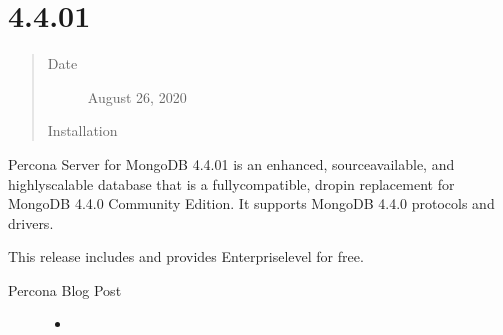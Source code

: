 \documentclass[letterpaper,10pt,english]{sphinxmanual}
\begin{document}
\section{ 4.4.0\sphinxhyphen{}1}
\label{\detokenize{release_notes/4.4.0-1:percona-server-for-mongodb-4-4-0-1}}\label{\detokenize{release_notes/4.4.0-1:psmdb-4-4-0-1}}\label{\detokenize{release_notes/4.4.0-1::doc}}\begin{quote}\begin{description}
\item[{Date}] \leavevmode
\sphinxAtStartPar
August 26, 2020

\item[{Installation}] \leavevmode
\sphinxAtStartPar
{}

\end{description}\end{quote}

\sphinxAtStartPar
Percona Server for MongoDB 4.4.0\sphinxhyphen{}1 is an enhanced, source\sphinxhyphen{}available, and highly\sphinxhyphen{}scalable database that is a
fully\sphinxhyphen{}compatible, drop\sphinxhyphen{}in replacement for MongoDB 4.4.0 Community Edition.
It supports MongoDB 4.4.0 protocols and drivers.

\sphinxAtStartPar
This release includes  and provides Enterprise\sphinxhyphen{}level  for free.


\nopagebreak

\begin{description}
\item[{Percona Blog Post}] \leavevmode\begin{itemize}
\item {} 
\sphinxAtStartPar
{}

\end{itemize}

\end{description}
\end{document}
